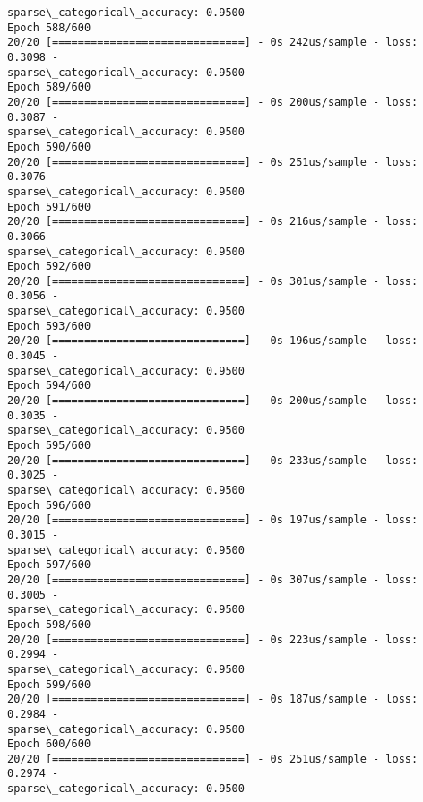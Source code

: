 \documentclass[11pt]{article}
\begin{document}
\begin{Verbatim}[commandchars=\\\{\}]
sparse\_categorical\_accuracy: 0.9500
Epoch 588/600
20/20 [==============================] - 0s 242us/sample - loss: 0.3098 -
sparse\_categorical\_accuracy: 0.9500
Epoch 589/600
20/20 [==============================] - 0s 200us/sample - loss: 0.3087 -
sparse\_categorical\_accuracy: 0.9500
Epoch 590/600
20/20 [==============================] - 0s 251us/sample - loss: 0.3076 -
sparse\_categorical\_accuracy: 0.9500
Epoch 591/600
20/20 [==============================] - 0s 216us/sample - loss: 0.3066 -
sparse\_categorical\_accuracy: 0.9500
Epoch 592/600
20/20 [==============================] - 0s 301us/sample - loss: 0.3056 -
sparse\_categorical\_accuracy: 0.9500
Epoch 593/600
20/20 [==============================] - 0s 196us/sample - loss: 0.3045 -
sparse\_categorical\_accuracy: 0.9500
Epoch 594/600
20/20 [==============================] - 0s 200us/sample - loss: 0.3035 -
sparse\_categorical\_accuracy: 0.9500
Epoch 595/600
20/20 [==============================] - 0s 233us/sample - loss: 0.3025 -
sparse\_categorical\_accuracy: 0.9500
Epoch 596/600
20/20 [==============================] - 0s 197us/sample - loss: 0.3015 -
sparse\_categorical\_accuracy: 0.9500
Epoch 597/600
20/20 [==============================] - 0s 307us/sample - loss: 0.3005 -
sparse\_categorical\_accuracy: 0.9500
Epoch 598/600
20/20 [==============================] - 0s 223us/sample - loss: 0.2994 -
sparse\_categorical\_accuracy: 0.9500
Epoch 599/600
20/20 [==============================] - 0s 187us/sample - loss: 0.2984 -
sparse\_categorical\_accuracy: 0.9500
Epoch 600/600
20/20 [==============================] - 0s 251us/sample - loss: 0.2974 -
sparse\_categorical\_accuracy: 0.9500
    \end{Verbatim}
\end{document}
